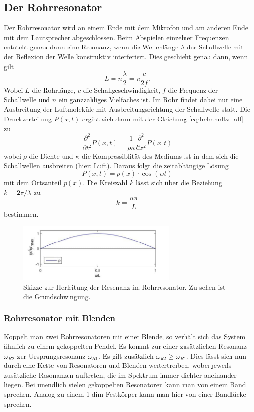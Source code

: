 \subsection{Der Rohrresonator}
Der Rohrresonator wird an einem Ende mit dem Mikrofon und am anderen Ende mit dem Lautsprecher abgeschlossen.
Beim Abspielen einzelner Frequenzen entsteht genau dann eine Resonanz, wenn die Wellenlänge $\lambda$ der Schallwelle
mit der Reflexion der Welle konstruktiv interferiert. Dies geschieht genau dann, wenn gilt
\begin{equation}
    L=n\frac{\lambda}{2}=n\frac{c}{2f}.
\end{equation}
Wobei $L$ die Rohrlänge, $c$ die Schallgeschwindigkeit, $f$ die Frequenz der Schallwelle und $n$ ein ganzzahliges Vielfaches ist.
Im Rohr findet dabei nur eine Ausbreitung der Luftmoleküle mit Ausbreitungsrichtung der Schallwelle statt.
Die Druckverteilung $P(x,t)$ ergibt sich dann mit der Gleichung \ref{eq:helmholtz_all} zu
\begin{equation}
    \frac{\partial^2}{\partial t^2}P(x,t)=\frac{1}{\rho \kappa}\frac{\partial^2}{\partial x^2}P(x,t)
\end{equation}
\label{sec:Theorie}
wobei $\rho$ die Dichte und $\kappa$ die Kompressiblität des Mediums ist in dem sich die Schallwellen ausbreiten (hier: Luft).
Daraus folgt die zeitabhängige Lösung
\begin{equation}
    P(x,t)=p(x)\cdot \cos{(wt)}
    \label{eq:rohr_loe}
\end{equation}
mit dem Ortsanteil $p(x)$.
Die Kreiszahl $k$ lässt sich über die Beziehung $k=2\pi/\lambda$ zu
\begin{equation}
    k=\frac{n\pi}{L}
\end{equation}
bestimmen.

\begin{figure}
    \center
    \includegraphics[width=0.7\textwidth]{bilder/Resonanz.jpg}
    \caption{Skizze zur Herleitung der Resonanz im Rohrresonator. Zu sehen ist die Grundschwingung. \cite{uni}}
\end{figure}

\subsubsection{Rohrresonator mit Blenden}
Koppelt man zwei Rohrresonatoren mit einer Blende, so verhält sich das System ähnlich zu einem 
gekoppelten Pendel. Es kommt zur einer zusätzlichen Resonanz $\omega_{R2}$ zur Ursprungsresonanz $\omega_{R1}$.
Es gilt zusätzlich $\omega_{R2}\geq \omega_{R1}$. Dies lässt sich nun durch eine Kette von Resonatoren und Blenden weitertreiben, wobei
jeweils zusätzliche Resonanzen auftreten, die im Spektrum immer dichter aneinander liegen.
Bei unendlich vielen gekoppelten Resonatoren kann man von einem Band sprechen.
Analog zu einem 1-dim-Festkörper kann man hier von einer Bandlücke sprechen.

